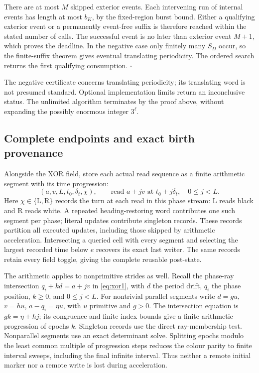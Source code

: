 There are at most \(M\) skipped exterior events. Each intervening run of
internal events has length at most \(b_K\), by the fixed-region burst bound.
Either a qualifying exterior event or a permanently event-free suffix is
therefore reached within the stated number of calls. The successful event
is no later than exterior event \(M+1\), which proves the deadline. In the
negative case only finitely many \(S_D\) occur, so the finite-suffix theorem
gives eventual translating periodicity. The ordered search returns the first
qualifying consumption. \(\square\)

The negative certificate concerns translating periodicity; its translating
word is not presumed standard. Optional implementation limits return an
inconclusive status. The unlimited algorithm terminates by the proof above,
without expanding the possibly enormous integer \(3^\ell\).

\subsection{Complete endpoints and exact birth provenance}
Alongside the XOR field, store each actual read sequence as a finite
arithmetic segment with its time progression:
\[
 (a,v,L,t_0,\delta_t,\chi),\qquad
 \text{read }a+jv\text{ at }t_0+j\delta_t,\quad 0\le j<L.
\]
Here \(\chi\in\{\mathrm L,\mathrm R\}\) records the turn at each read in
this phase stream: \(\mathrm L\) reads black and \(\mathrm R\) reads white.
A repeated heading-restoring word contributes one such segment per phase;
literal updates contribute singleton records. These records partition all
executed updates, including those skipped by arithmetic acceleration.
Intersecting a queried cell with every segment and selecting the largest
recorded time below \(e\) recovers its exact last writer. The same records
retain every field toggle, giving the complete reusable post-state.

The arithmetic applies to nonprimitive strides as well. Recall the
phase-ray intersection \(q_i+kd=a+jv\) in \eqref{eq:xor1}, with
\(d\) the period drift, \(q_i\) the phase position, \(k\ge0\), and
\(0\le j<L\). For nontrivial parallel segments write \(d=gu\),
\(v=hu\), \(a-q_i=\eta u\), with \(u\) primitive and \(g>0\).
The intersection equation is \(gk=\eta+hj\); its congruence and finite
index bounds give a finite arithmetic progression of epochs \(k\).
Singleton records use the direct ray-membership test. Nonparallel
segments use an exact determinant solve. Splitting epochs modulo the least
common multiple of progression steps reduces the colour parity to finite
interval sweeps, including the final infinite interval. Thus neither a
remote initial marker nor a remote write is lost during acceleration.

